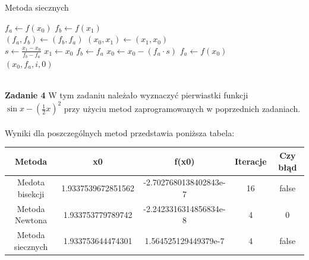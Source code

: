 \documentclass[15pt, a4paper]{article}
\begin{document}
\begin{algorithm}
\caption{Metoda siecznych}
\label{alg:secant_method}
\begin{algorithmic}[1]
    \State $f_a \gets f(x_0)$
    \State $f_b \gets f(x_1)$\\

            \State $(f_a, f_b) \gets (f_b, f_a)$
            \State $(x_0, x_1) \gets (x_1, x_0)$
        \EndIf\\

        \State $s \gets \frac{x_1 - x_0}{f_b - f_a}$
        \State $x_1 \gets x_0$
        \State $f_b \gets f_a$
        \State $x_0 \gets x_0 - (f_a \cdot s)$
        \State $f_a \gets f(x_0)$\\

            \State \Return $(x_0, f_a, i, 0)$
        \EndIf
    \EndFor\\ 

    \State \Return {}\\
\EndFunction
\end{algorithmic}
\end{algorithm}

\vspace{0.5cm}

\noindent\hrulefill

\vspace{0.5cm}


\noindent\textbf{Zadanie 4} W tym zadaniu należało wyznaczyć pierwiastki funkcji \(\sin x - \left(\frac{1}{2}x\right)^2\) przy użyciu metod zaprogramowanych w poprzednich zadaniach.\\\\
\noindent Wyniki dla poszczególnych metod przedstawia poniższa tabela:

\begin{table}[ht]
\begin{adjustbox}{max width=\textwidth}
\begin{tabular}{|c|c|c|c|c|}
    \hline
    \textbf{Metoda} & \textbf{x0} & \textbf{f(x0)} & \textbf{Iteracje} & \textbf{Czy błąd} \\
    \hline
    Medota bisekcji & 1.9337539672851562 & -2.7027680138402843e-7 & 16 & false \\
    \hline
    Metoda Newtona & 1.933753779789742 & -2.2423316314856834e-8 & 4 & 0 \\
    \hline
    Metoda siecznych & 1.933753644474301 & 1.564525129449379e-7 & 4 & false \\
    \hline
\end{tabular}
\end{adjustbox}
\end{table}
\end{document}

